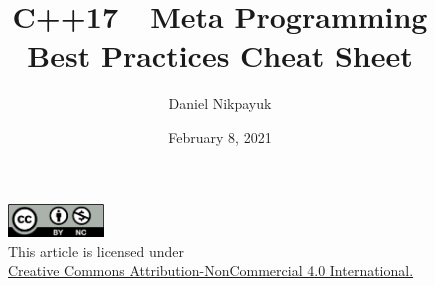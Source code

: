 \documentclass[twoside]{article}
\title{C++17\ \ Meta Programming\\Best Practices Cheat Sheet}
\author{Daniel Nikpayuk}
\date{February 8, 2021}
\begin{document}
\maketitle
\thispagestyle{empty}

\begin{figure}[h]
\centering
\includegraphics[width=1in]{../../../cc-by-nc.png}\\[0.1in]
\tiny This article is licensed under \\
\href{http://creativecommons.org/licenses/by-nc/4.0/}
{Creative Commons Attribution-NonCommercial 4.0 International.}\\[0.3in]
\end{figure}
\end{document}

